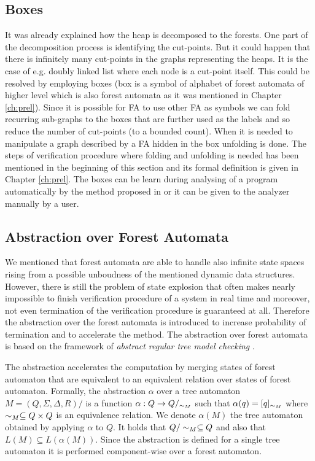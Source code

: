 \subsection{Boxes}
\label{subsec:boxes}

It was already explained how the heap is decomposed to the forests.
One part of the decomposition process is identifying the cut-points.
But it could happen that there is infinitely many cut-points in the graphs representing the heaps.
It is the case of e.g. doubly linked list where each node is a cut-point itself.
This could be resolved by employing boxes (box is a symbol of alphabet of forest automata of higher level which is also forest automata as it was mentioned in Chapter \ref{ch:prel}).
Since it is possible for FA to use other FA as symbols we can fold recurring sub-graphs to the boxes that are further used as the labels
and so reduce the number of cut-points (to a bounded count).
When it is needed to manipulate a graph described by a FA hidden in the box unfolding is done.
The steps of verification procedure where folding and unfolding is needed has been mentioned in the beginning of this section
and its formal definition is given in Chapter \ref{ch:prel}.
The boxes can be learn during analysing of a program automatically by the method proposed in \cite{forester13} or
it can be given to the analyzer manually by a user.

\subsection{Abstraction over Forest Automata}
\label{subsec:abstraction}

We mentioned that forest automata are able to handle also infinite state spaces
rising from a possible unboudness of the mentioned dynamic data structures.
However, there is still the problem of state explosion that often makes
nearly impossible to finish verification procedure of a system in real time
and moreover, not even termination of the verification procedure is guaranteed at all.
Therefore the abstraction over the forest automata is introduced to increase probability of termination
and to accelerate the method.
The abstraction over forest automata is based on the framework of \emph{abstract regular tree model checking} \cite{artmc}.

The abstraction accelerates the computation by merging states of forest automaton that are equivalent
to an equivalent relation over states of forest automaton.
Formally, the abstraction $\alpha$ over a tree automaton $M=(Q, \Sigma, \Delta, R)/$ is
a function $\alpha: Q \rightarrow Q/_{\sim_M}$ such that $\alpha(q) = [q]_{\sim_M}$
where $\sim_M \subseteq Q \times Q$ is an equivalence relation.
We denote $\alpha(M)$ the tree automaton obtained by applying $\alpha$ to $Q$.
It holds that $Q/\sim_M \subseteq Q$ and also that $L(M) \subseteq L(\alpha(M))$.
Since the abstraction is defined for a single tree automaton
it is performed component-wise over a forest automaton.

